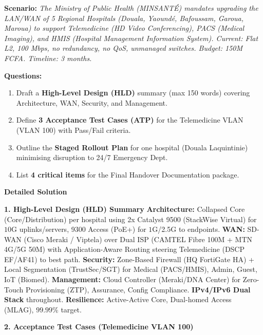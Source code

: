 \documentclass[11pt]{article}
\begin{document}
\begin{exoresolu}
\textbf{Scenario:} \textit{The Ministry of Public Health (MINSANT\'E) mandates upgrading the LAN/WAN of 5 Regional Hospitals (Douala, Yaound\'e, Bafoussam, Garoua, Maroua) to support Telemedicine (HD Video Conferencing), PACS (Medical Imaging), and HMIS (Hospital Management Information System). Current: Flat L2, 100 Mbps, no redundancy, no QoS, unmanaged switches. Budget: 150M FCFA. Timeline: 3 months.}

\textbf{Questions:}
\begin{enumerate}
    \item Draft a \textbf{High-Level Design (HLD)} summary (max 150 words) covering Architecture, WAN, Security, and Management.
    \item Define \textbf{3 Acceptance Test Cases (ATP)} for the Telemedicine VLAN (VLAN 100) with Pass/Fail criteria.
    \item Outline the \textbf{Staged Rollout Plan} for one hospital (Douala Laquintinie) minimising disruption to 24/7 Emergency Dept.
    \item List \textbf{4 critical items} for the Final Handover Documentation package.
\end{enumerate}
\tcblower
\textbf{Detailed Solution}

\noindent\textbf{1. High-Level Design (HLD) Summary}
\textbf{Architecture:} Collapsed Core (Core/Distribution) per hospital using 2x Catalyst 9500 (StackWise Virtual) for $10$G uplinks/servers, 9300 Access (PoE+) for $1$G/2.5G to endpoints. \textbf{WAN:} SD-WAN (Cisco Meraki / Viptela) over Dual ISP (CAMTEL Fibre 100M + MTN 4G/5G 50M) with Application-Aware Routing steering Telemedicine (DSCP EF/AF41) to best path. \textbf{Security:} Zone-Based Firewall (HQ FortiGate HA) + Local Segmentation (TrustSec/SGT) for Medical (PACS/HMIS), Admin, Guest, IoT (Biomed). \textbf{Management:} Cloud Controller (Meraki/DNA Center) for Zero-Touch Provisioning (ZTP), Assurance, Config Compliance. \textbf{IPv4/IPv6 Dual Stack} throughout. \textbf{Resilience:} Active-Active Core, Dual-homed Access (MLAG), $99.99\%$ target.

\noindent\textbf{2. Acceptance Test Cases (Telemedicine VLAN 100)}


\end{exoresolu}
\end{document}
